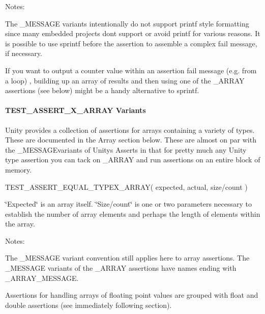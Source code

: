 Notes\+:
\begin{DoxyItemize}
\item The {\ttfamily \+\_\+\+M\+E\+S\+S\+A\+GE} variants intentionally do not support {\ttfamily printf} style formatting since many embedded projects don\textquotesingle{}t support or avoid {\ttfamily printf} for various reasons. It is possible to use {\ttfamily sprintf} before the assertion to assemble a complex fail message, if necessary.
\item If you want to output a counter value within an assertion fail message (e.\+g. from a loop) , building up an array of results and then using one of the {\ttfamily \+\_\+\+A\+R\+R\+AY} assertions (see below) might be a handy alternative to {\ttfamily sprintf}.
\end{DoxyItemize}

\paragraph*{T\+E\+S\+T\+\_\+\+A\+S\+S\+E\+R\+T\+\_\+\+X\+\_\+\+A\+R\+R\+AY Variants}

Unity provides a collection of assertions for arrays containing a variety of types. These are documented in the Array section below. These are almost on par with the {\ttfamily \+\_\+\+M\+E\+S\+S\+A\+GE}variants of Unity\textquotesingle{}s Asserts in that for pretty much any Unity type assertion you can tack on {\ttfamily \+\_\+\+A\+R\+R\+AY} and run assertions on an entire block of memory. \begin{DoxyVerb}TEST_ASSERT_EQUAL_TYPEX_ARRAY( expected, actual, {size/count} )
\end{DoxyVerb}


\char`\"{}\+Expected\char`\"{} is an array itself. \char`\"{}\+Size/count\char`\"{} is one or two parameters necessary to establish the number of array elements and perhaps the length of elements within the array.

Notes\+:
\begin{DoxyItemize}
\item The {\ttfamily \+\_\+\+M\+E\+S\+S\+A\+GE} variant convention still applies here to array assertions. The {\ttfamily \+\_\+\+M\+E\+S\+S\+A\+GE} variants of the {\ttfamily \+\_\+\+A\+R\+R\+AY} assertions have names ending with {\ttfamily \+\_\+\+A\+R\+R\+A\+Y\+\_\+\+M\+E\+S\+S\+A\+GE}.
\item Assertions for handling arrays of floating point values are grouped with float and double assertions (see immediately following section).
\end{DoxyItemize}

